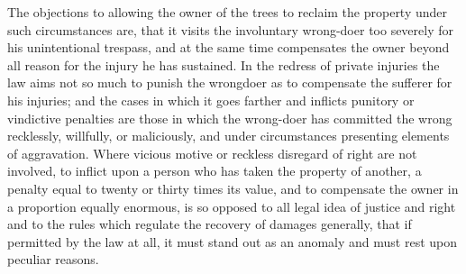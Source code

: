 The objections to allowing the owner of the trees to reclaim the property under
such circumstances are, that it visits the involuntary wrong-doer too severely
for his unintentional trespass, and at the same time compensates the owner
beyond all reason for the injury he has sustained. In the redress of private
injuries the law aims not so much to punish the wrongdoer as to compensate the
sufferer for his injuries; and the cases in which it goes farther and inflicts
punitory or vindictive penalties are those in which the wrong-doer has
committed the wrong recklessly, willfully, or maliciously, and under
circumstances presenting elements of aggravation. Where vicious motive or
reckless disregard of right are not involved, to inflict upon a person who has
taken the property of another, a penalty equal to twenty or thirty times its
value, and to compensate the owner in a proportion equally enormous, is so
opposed to all legal idea of justice and right and to the rules which regulate
the recovery of damages generally, that if permitted by the law at all, it must
stand out as an anomaly and must rest upon peculiar reasons.

